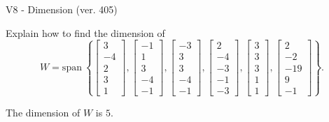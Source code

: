 \begin{exercise}
  \begin{exerciseTitle}V8 - Dimension (ver. 405)\end{exerciseTitle}
  \begin{exerciseStatement}
    Explain how to find the dimension of 
\[W=\mathrm{span}\ \left\{\left[\begin{array}{r}
3 \\
-4 \\
2 \\
3 \\
1
\end{array}\right] , \left[\begin{array}{r}
-1 \\
1 \\
3 \\
-4 \\
-1
\end{array}\right] , \left[\begin{array}{r}
-3 \\
3 \\
3 \\
-4 \\
-1
\end{array}\right] , \left[\begin{array}{r}
2 \\
-4 \\
-3 \\
-1 \\
-3
\end{array}\right] , \left[\begin{array}{r}
3 \\
3 \\
3 \\
1 \\
1
\end{array}\right] , \left[\begin{array}{r}
2 \\
-2 \\
-19 \\
9 \\
-1
\end{array}\right]\right\}.\]



  \end{exerciseStatement}
  \begin{exerciseAnswer}
   The dimension of \(W\) is  \(5\).
  


  \end{exerciseAnswer}
\end{exercise}